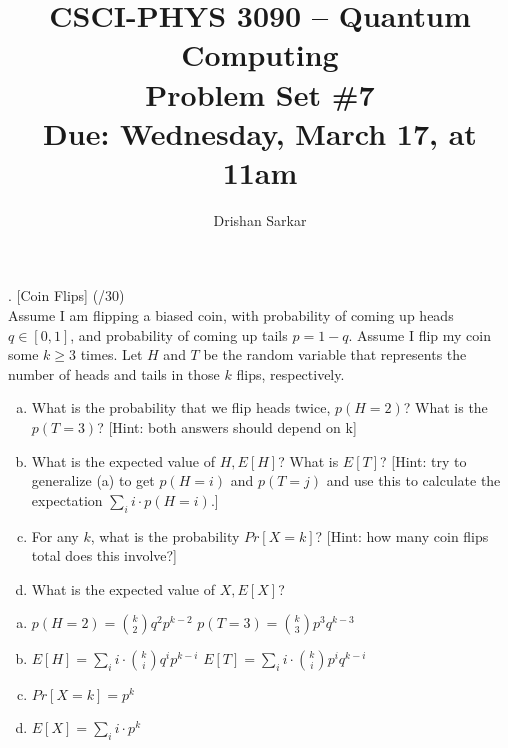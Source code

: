 \documentclass[11pt]{article}
\newenvironment{solution}{\begin{mdframed}[skipabove=\baselineskip,innertopmargin=\baselineskip,innerbottommargin=\baselineskip]
  }{\end{mdframed}}
\begin{document}
\date{}
\author{Drishan Sarkar}
\title{CSCI-PHYS 3090 -- Quantum Computing\\ Problem Set \#7 \\  Due: Wednesday, March 17, at 11am}
\maketitle

 
. [Coin Flips] (/30)
\\
Assume I am flipping a biased coin, with probability of coming up heads $q\in[0,1]$, and probability of coming up tails $p=1-q$. Assume I flip my coin some $k\geq3$ times. Let $H$ and $T$ be the random variable that represents the number of heads and tails in those $k$ flips, respectively.

\begin{enumerate}[(a)]
    \item What is the probability that we flip heads twice, $p(H = 2)$? What is the $p(T = 3)$?
[Hint: both answers should depend on k]
    \item What is the expected value of $H, E[H]$? What is $E[T]$? [Hint: try to generalize (a) to get $p(H = i)$ and $p(T = j)$ and use this to calculate the expectation $\sum_i i\cdot p(H = i)$.]
    \item For any $k$, what is the probability $Pr[X = k]$? [Hint: how many coin flips total does this involve?]
    \item What is the expected value of $X, E[X]$?
\end{enumerate}

\begin{solution}
\begin{enumerate}[(a)]
    \item $p(H = 2) = {k \choose 2} q^2 p^{k-2}$ \hspace{3em} $p(T = 3) = {k \choose 3} p^3 q^{k-3}$
    \item $E[H] = \sum_i i\cdot{k \choose i} q^i p^{k-i}$ \hspace{3em} $E[T] = \sum_i i\cdot{k \choose i} p^i q^{k-i}$
    \item $Pr[X = k] = p^{k}$
    \item $E[X] = \sum_i i \cdot p^k$
\end{enumerate}
\end{solution}
\end{document}
